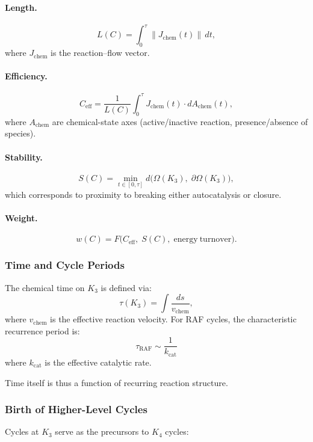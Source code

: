 \paragraph{Length.}
\[
  L(C) = \int_0^\tau \|J_{\mathrm{chem}}(t)\|\, dt,
\]
where $J_{\mathrm{chem}}$ is the reaction–flow vector.

\paragraph{Efficiency.}
\[
  C_{\mathrm{eff}}
   = \frac{1}{L(C)}
     \int_0^\tau J_{\mathrm{chem}}(t)\cdot dA_{\mathrm{chem}}(t),
\]
where $A_{\mathrm{chem}}$ are chemical-state axes (active/inactive
reaction, presence/absence of species).

\paragraph{Stability.}
\[
  S(C) = \min_{t\in[0,\tau]}
         d\bigl(
           \Omega(K_3),\;
           \partial\Omega(K_3)
         \bigr),
\]
which corresponds to proximity to breaking either autocatalysis or
closure.

\paragraph{Weight.}
\[
  w(C) = F\bigl(
           C_{\mathrm{eff}},\;
           S(C),\;
           \mathrm{energy\ turnover}
         \bigr).
\]

\subsubsection{Time and Cycle Periods}

The chemical time on $K_3$ is defined via:
\[
  \tau(K_3) = \int \frac{ds}{v_{\mathrm{chem}}},
\]
where $v_{\mathrm{chem}}$ is the effective reaction velocity.
For RAF cycles, the characteristic recurrence period is:
\[
  \tau_{\mathrm{RAF}}
  \sim \frac{1}{k_{\mathrm{cat}}}
\]
where $k_{\mathrm{cat}}$ is the effective catalytic rate.

Time itself is thus a function of recurring reaction structure.

\subsubsection{Birth of Higher-Level Cycles}

Cycles at $K_3$ serve as the precursors to $K_4$ cycles:

